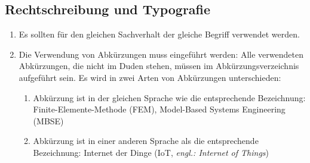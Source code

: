 \subsection{Rechtschreibung und Typografie}

\begin{enumerate}

    \item Es sollten für den gleichen Sachverhalt der gleiche Begriff verwendet werden.
    \item Die Verwendung von Abkürzungen muss eingeführt werden: 
    Alle verwendeten Abkürzungen, die nicht im Duden stehen, müssen im Abkürzungsverzeichnis aufgeführt sein. Es wird in zwei Arten von Abkürzungen unterschieden:
    
    \begin{enumerate}
        \item Abkürzung ist in der gleichen Sprache wie die entsprechende Bezeichnung: Finite-Elemente-Methode (FEM), Model-Based Systems Engineering (MBSE)
        \item Abkürzung ist in einer anderen Sprache als die entsprechende Bezeichnung: Internet der Dinge (IoT, \textit{engl.: Internet of Things})
    \end{enumerate}


\end{enumerate}
